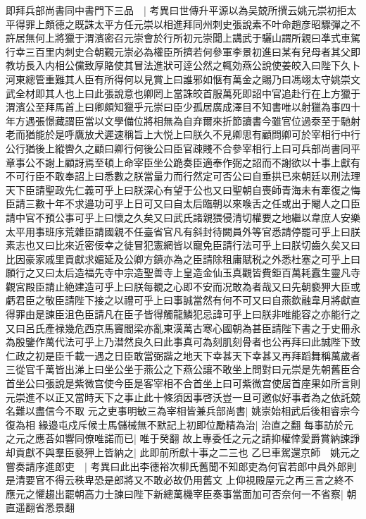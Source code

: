 即拜兵部尚書同中書門下三品　|{
	考異曰世傳升平源以為吴兢所撰云姚元崇初拒太平得罪上頗德之既誅太平方任元崇以相進拜同州刺史張說素不叶命趙彦昭驟彈之不許居無何上將獵于渭濱密召元崇會於行所初元崇聞上講武于驪山謂所親曰凖式車駕行幸三百里内刺史合朝覲元崇必為權臣所擠若何參軍李景初進曰某有兒母者其父即教坊長入内相公儻致厚賂使其冒法進狀可逹公然之輒効燕公說使姜皎入曰陛下久卜河東總管重難其人臣有所得何以見賞上曰誰邪如愜有萬金之賜乃曰馮翊太守姚崇文武全材即其人也上曰此張說意也卿罔上當誅皎首服萬死即詔中官追赴行在上方獵于渭濱公至拜馬首上曰卿頗知獵乎元崇曰臣少孤居廣成澤目不知書唯以射獵為事四十年方遇張憬藏謂臣當以文學備位將相無為自弃爾來折節讀書今雖官位過沗至于馳射老而猶能於是呼鷹放犬遲速稱旨上大悦上曰朕久不見卿思有顧問卿可於宰相行中行公行猶後上縱轡久之顧曰卿行何後公曰臣官疎賤不合參宰相行上曰可兵部尚書同平章事公不謝上顧訝焉至頓上命宰臣坐公跪奏臣適奉作弼之詔而不謝欲以十事上獻有不可行臣不敢奉詔上曰悉數之朕當量力而行然定可否公曰自垂拱已來朝廷以刑法理天下臣請聖政先仁義可乎上曰朕深心有望于公也又曰聖朝自喪師青海未有牽復之悔臣請三數十年不求邉功可乎上日可又曰自太后臨朝以來㗋舌之任或出于閹人之口臣請中官不預公事可乎上曰懷之久矣又曰武氏諸親猥侵清切權要之地繼以韋庶人安樂太平用事班序荒雜臣請國親不任臺省官凡有斜封待闕員外等官悉請停罷可乎上曰朕素志也又曰比來近密佞幸之徒冒犯憲網皆以寵免臣請行法可乎上曰朕切齒久矣又曰比因豪家戚里貢獻求媚延及公卿方鎮亦為之臣請除租庸賦税之外悉杜塞之可乎上曰願行之又曰太后造福先寺中宗造聖善寺上皇造金仙玉真觀皆費鉅百萬耗蠧生靈凡寺觀宮殿臣請止絶建造可乎上曰朕每覩之心即不安而况敢為者哉又曰先朝褻狎大臣或虧君臣之敬臣請陛下接之以禮可乎上曰事誠當然有何不可又曰自燕欽融韋月將獻直得罪由是諫臣沮色臣請凡在臣子皆得觸龍鱗犯忌諱可乎上曰朕非唯能容之亦能行之又曰呂氏產禄幾危西京馬竇閻梁亦亂東漢萬古寒心國朝為甚臣請陛下書之于史冊永為殷鑒作萬代法可乎上乃澘然良久曰此事真可為刻肌刻骨者也公再拜曰此誠陛下致仁政之初是臣千載一遇之日臣敢當弼諧之地天下幸甚天下幸甚又再拜蹈舞稱萬歲者三從官千萬皆出涕上曰坐公坐于燕公之下燕公讓不敢坐上問對曰元崇是先朝舊臣合首坐公曰張說是紫微宫使今臣是客宰相不合首坐上曰可紫微宫使居首座果如所言則元崇進不以正又當時天下之事止此十條須因事啓沃豈一旦可邀似好事者為之依託兢名難以盡信今不取}
元之吏事明敏三為宰相皆兼兵部尚書|{
	姚崇始相武后後相睿宗今復為相}
緣邉屯戍斥候士馬儲械無不默記上初即位勵精為治|{
	治直之翻}
每事訪於元之元之應荅如響同僚唯諾而已|{
	唯于癸翻}
故上專委任之元之請抑權倖愛爵賞納諫諍却貢獻不與羣臣褻狎上皆納之|{
	此即前所獻十事之二三也}
乙巳車駕還京師　姚元之嘗奏請序進郎吏　|{
	考異曰此出李德裕次柳氏舊聞不知郎吏為何官若郎中員外郎則是清要官不得云秩卑恐是郎將又不敢必故仍用舊文}
上仰視殿屋元之再三言之終不應元之懼趨出罷朝高力士諫曰陛下新總萬機宰臣奏事當面加可否奈何一不省察|{
	朝直遥翻省悉景翻}
